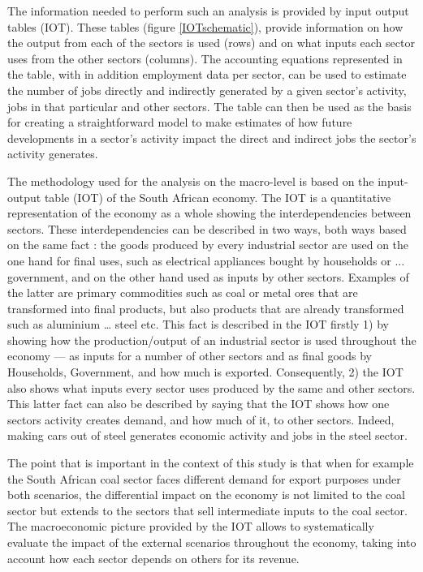 \documentclass[12pt,english]{article}
\begin{document}
The information needed to perform such an analysis is provided by input output tables (IOT). These tables (figure \ref{IOTschematic}), provide information on how the output from each of the sectors is used (rows) and on what inputs each sector uses from the other sectors (columns). The accounting equations represented in the table, with in addition employment data per sector, can be used to estimate the number of jobs directly and indirectly generated by a given sector's activity, jobs in that particular and other sectors. The table can then be used as the basis for creating a straightforward model to make estimates of how future developments in a sector's activity impact the direct and indirect jobs the sector's activity generates.



The methodology used for the analysis on the macro-level is based on the input-output table (IOT) of the South African economy. The IOT is a quantitative representation of the economy as a whole showing the interdependencies between sectors. These interdependencies can be described in two ways, both ways based on the same fact : the goods produced by every industrial sector are used on the one hand for final uses, such as electrical appliances bought by households or ... government, and on the other hand used as inputs by other sectors. Examples of the latter are primary commodities such as coal or metal ores that are transformed into final products, but also products that are already transformed such as aluminium \ldots{} steel etc. This fact is described in the IOT firstly 1) by showing how the production/output of an industrial sector is used throughout the economy --- as inputs for a number of other sectors and as final goods by Households, Government, and how much is exported. Consequently, 2) the IOT also shows what inputs every sector uses produced by the same and other sectors. This latter fact can also be described by saying that the IOT shows how one sectors activity creates demand, and how much of it, to other sectors. Indeed, making cars out of steel generates economic activity and jobs in the steel sector. 

The point that is important in the context of this study %
is that when for example the South African coal sector faces different demand for export purposes under both scenarios, the differential impact on the economy is not limited to the coal sector but extends to the sectors that sell intermediate inputs to the coal sector. The macroeconomic picture provided by the IOT allows to systematically evaluate the impact of the external scenarios throughout the economy, taking into account how each sector depends on others for its revenue. %
\end{document}
